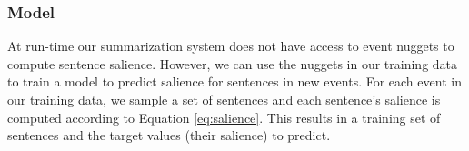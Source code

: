 

%
%
%
%
%
%
%

\subsubsection{Model}

At run-time
our summarization system
does not have access to event nuggets to compute sentence salience. 
However, we can use the nuggets
in our training data to train a model to predict salience for sentences
in new events.
For each event in our training data, we sample a set of sentences and  each 
sentence's salience is computed according to Equation \ref{eq:salience}.
This results in a training set of sentences and the target values 
(their salience) to predict.


